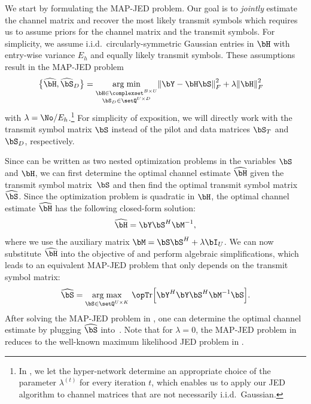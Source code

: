 We start by formulating the MAP-JED problem.
%
Our goal is to \emph{jointly} estimate the channel matrix and recover the most likely transmit symbols which requires us to assume priors for the channel matrix and the transmit symbols. For simplicity, we assume i.i.d.\ circularly-symmetric Gaussian entries in $\bH$ with entry-wise variance $E_h$ and equally likely transmit symbols.
%
These assumptions result in the MAP-JED problem
%
\begin{align}\label{eq:joint ML with H prior}
	\big\{\widehat \bH,\widehat\bS_D\big\} 
	& =  \argmin_{\substack{\bH\in\complexset^{B\times U}\\\bS_D\in\setQ^{U \times D}} } \normfro{\bY - \bH\bS}^2 + \lambda\normfro{\bH}^2
\end{align}
with $\lambda=\No/E_h$.\footnote{In , we let the hyper-network determine an appropriate choice of the parameter $\lambda^{(t)}$ for every iteration $t$, which enables us to apply our JED algorithm to channel matrices that are not necessarily i.i.d.\ Gaussian.}
%
For simplicity of exposition, we will directly work with the transmit symbol matrix $\bS$ instead of the pilot and data matrices $\bS_T$ and $\bS_D$, respectively. 

Since  can be written as two nested optimization problems in the variables $\bS$ and $\bH$, we can first determine the optimal channel estimate $\widehat{\bH}$ given the transmit symbol matrix~$\bS$ and then find the optimal transmit symbol matrix $\widehat{\bS}$.
%
Since the optimization problem is quadratic in $\bH$, the optimal channel estimate $\widehat{\bH}$ has the following closed-form solution:
\begin{align} \label{eq:optchannelest}
    \widehat\bH =\bY\bS^H\bM^{-1},
\end{align}
where we use the auxiliary matrix $\bM = \bS\bS^H + \lambda\bI_{U}$.
%
We can now substitute $\widehat\bH$ into the objective of  and perform algebraic simplifications, which leads to an equivalent MAP-JED problem that only depends on the transmit symbol matrix: 
%
\begin{align}\label{eq:opt1}
	\widehat{\bS} = \argmax\limits_{\bS\in\setQ^{U\times K}}\, \Tr\!\left[\bY^H\bY\bS^H\bM^{-1}\bS\right]\!.
\end{align}
%
After solving the MAP-JED problem in , one can determine the optimal channel estimate by plugging $\widehat\bS$ into~. 
%
Note that for $\lambda = 0$, the MAP-JED problem in   reduces to the well-known maximum likelihood JED problem in \cite[Eq.~6]{xu2008exact}.